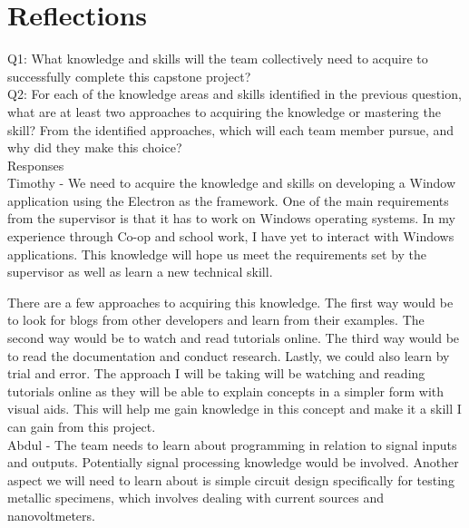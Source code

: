 \documentclass[12pt, titlepage]{article}
\begin{document}
\section{Reflections}

\noindent Q1: What knowledge and skills will the team collectively need to acquire to successfully complete this capstone project? \\
\noindent Q2: For each of the knowledge areas and skills identified in the previous question, what are at least two approaches to acquiring the knowledge or mastering the skill? 
From the identified approaches, which will each team member pursue, and why did they make this choice?\\

\noindent Responses\\


Timothy - We need to acquire the knowledge and skills on developing a Window application using the Electron as the framework. One of the main requirements
from the supervisor is that it has to work on Windows operating systems. In my experience through Co-op and school work, I have 
yet to interact with Windows applications. This knowledge will hope us meet the requirements set by the supervisor as well 
as learn a new technical skill. 

There are a few approaches to acquiring this knowledge. The first way would be to look for blogs from other developers and learn from their
examples. The second way would be to watch and read tutorials online. The third way would be to read the documentation and conduct research. Lastly, 
we could also learn by trial and error. The approach I will be taking will be watching and reading tutorials online as they will be able to explain 
concepts in a simpler form with visual aids. This will help me gain knowledge in this concept and 
make it a skill I can gain from this project.\\

Abdul - The team needs to learn about programming in relation to signal inputs and outputs. Potentially signal processing knowledge would be involved. Another aspect we will need to learn about is simple circuit design specifically for testing metallic specimens, which involves dealing with current sources and nanovoltmeters.
\end{document}
